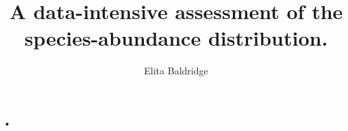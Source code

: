 \documentclass[20pt]{beamer}
\author{Elita Baldridge}
\title{A data-intensive assessment of the species-abundance distribution.
}
\begin{document}
\begin{frame}
\titlepage
\end{frame}


\begin{frame}{•}

\end{frame}
\end{document}
